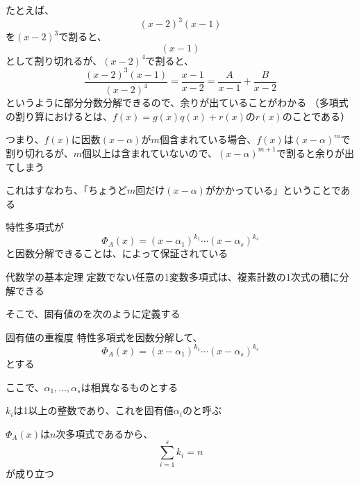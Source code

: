 \documentclass[../../../topic_linear-algebra]{subfiles}
\begin{document}
\br

たとえば、
\begin{equation*}
  (x-2)^3 (x-1)
\end{equation*}
を$(x-2)^3$で割ると、
\begin{equation*}
  (x - 1)
\end{equation*}
として割り切れるが、$(x-2)^4$で割ると、
\begin{equation*}
  \frac{(x-2)^3 (x-1)}{(x-2)^4} = \frac{x-1}{x-2} = \frac{A}{x-1} + \frac{B}{x-2}
\end{equation*}
というように部分分数分解できるので、余りが出ていることがわかる
（多項式の割り算におけるとは、$f(x) = g(x)q(x) + r(x)$の$r(x)$のことである）

\br

つまり、$f(x)$に因数$(x-\alpha)$が$m$個含まれている場合、$f(x)$は$(x-\alpha)^m$で割り切れるが、$m$個以上は含まれていないので、$(x-\alpha)^{m+1}$で割ると余りが出てしまう

これはすなわち、「ちょうど$m$回だけ$(x-\alpha)$がかかっている」ということである

\sectionline

特性多項式が
\begin{equation*}
  \Phi_A(x) = (x- \alpha_1)^{k_1}\cdots (x - \alpha_s)^{k_s}
\end{equation*}
と因数分解できることは、によって保証されている

\begin{theorem*}{代数学の基本定理}
  定数でない任意の1変数多項式は、複素計数の1次式の積に分解できる
\end{theorem*}

そこで、固有値のを次のように定義する

\begin{definition}{固有値の重複度}\label{def:algebraic-multiplicity}
  特性多項式を因数分解して、
  \begin{equation*}
    \Phi_A(x) = (x- \alpha_1)^{k_1}\cdots (x - \alpha_s)^{k_s}
  \end{equation*}
  とする

  ここで、$\alpha_1,\ldots, \alpha_s$は相異なるものとする

  $k_i$は1以上の整数であり、これを固有値$\alpha_i$のと呼ぶ

  $\Phi_A(x)$は$n$次多項式であるから、
  \begin{equation*}
    \sum_{i=1}^s k_i = n
  \end{equation*}
  が成り立つ
\end{definition}
\end{document}
